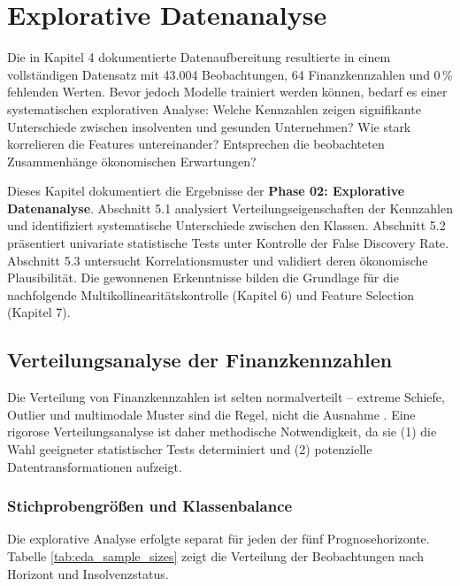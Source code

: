 \chapter{Explorative Datenanalyse}

Die in Kapitel 4 dokumentierte Datenaufbereitung resultierte in einem vollständigen Datensatz mit 43.004 Beobachtungen, 64 Finanzkennzahlen und 0\,\% fehlenden Werten. Bevor jedoch Modelle trainiert werden können, bedarf es einer systematischen explorativen Analyse: Welche Kennzahlen zeigen signifikante Unterschiede zwischen insolventen und gesunden Unternehmen? Wie stark korrelieren die Features untereinander? Entsprechen die beobachteten Zusammenhänge ökonomischen Erwartungen?

Dieses Kapitel dokumentiert die Ergebnisse der \textbf{Phase 02: Explorative Datenanalyse}. Abschnitt 5.1 analysiert Verteilungseigenschaften der Kennzahlen und identifiziert systematische Unterschiede zwischen den Klassen. Abschnitt 5.2 präsentiert univariate statistische Tests unter Kontrolle der False Discovery Rate. Abschnitt 5.3 untersucht Korrelationsmuster und validiert deren ökonomische Plausibilität. Die gewonnenen Erkenntnisse bilden die Grundlage für die nachfolgende Multikollinearitätskontrolle (Kapitel 6) und Feature Selection (Kapitel 7).

\section{Verteilungsanalyse der Finanzkennzahlen}

Die Verteilung von Finanzkennzahlen ist selten normalverteilt – extreme Schiefe, Outlier und multimodale Muster sind die Regel, nicht die Ausnahme \parencite{altman1968financial}. Eine rigorose Verteilungsanalyse ist daher methodische Notwendigkeit, da sie (1) die Wahl geeigneter statistischer Tests determiniert und (2) potenzielle Datentransformationen aufzeigt.

\subsection{Stichprobengrößen und Klassenbalance}

Die explorative Analyse erfolgte separat für jeden der fünf Prognosehorizonte. Tabelle \ref{tab:eda_sample_sizes} zeigt die Verteilung der Beobachtungen nach Horizont und Insolvenzstatus.


